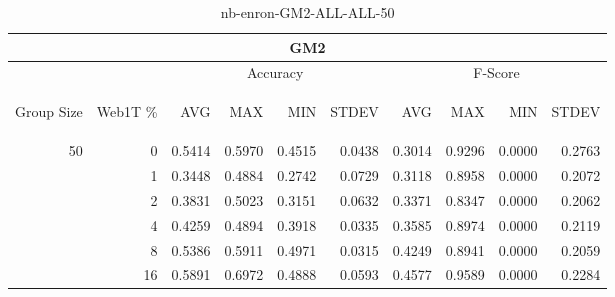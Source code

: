 \begin{center}
\begin{table}[htbp] 
 \begin{center}
\begin{tabular}{ | r | r | r | r | r | r | r | r | r | r |}
\hline
\multicolumn{10}{|c|}{GM2}\\
\hline
 & & \multicolumn{4}{|c|}{Accuracy} & \multicolumn{4}{|c|}{F-Score}\\ \cline{3-10}
\begin{sideways}Group Size\end{sideways} & \begin{sideways}Web1T \%\end{sideways} & \begin{sideways}AVG\end{sideways} & \begin{sideways}MAX\end{sideways} & \begin{sideways}MIN\end{sideways} & \begin{sideways}STDEV\end{sideways} & \begin{sideways}AVG\end{sideways} & \begin{sideways}MAX\end{sideways} & \begin{sideways}MIN\end{sideways} & \begin{sideways}STDEV\end{sideways}\\
\hline
\multirow{5}{*}{50}
 & 0 & 0.5414 & 0.5970 & 0.4515 & 0.0438 & 0.3014 & 0.9296 & 0.0000 & 0.2763\\ \cline{2-10}
 & 1 & 0.3448 & 0.4884 & 0.2742 & 0.0729 & 0.3118 & 0.8958 & 0.0000 & 0.2072\\ \cline{2-10}
 & 2 & 0.3831 & 0.5023 & 0.3151 & 0.0632 & 0.3371 & 0.8347 & 0.0000 & 0.2062\\ \cline{2-10}
 & 4 & 0.4259 & 0.4894 & 0.3918 & 0.0335 & 0.3585 & 0.8974 & 0.0000 & 0.2119\\ \cline{2-10}
 & 8 & 0.5386 & 0.5911 & 0.4971 & 0.0315 & 0.4249 & 0.8941 & 0.0000 & 0.2059\\ \cline{2-10}
 & 16 & 0.5891 & 0.6972 & 0.4888 & 0.0593 & 0.4577 & 0.9589 & 0.0000 & 0.2284\\ \cline{2-10}
\hline
\end{tabular}
\caption{nb-enron-GM2-ALL-ALL-50}
\label{table:nb-enron-GM2-ALL-ALL-50}
\end{center}
 \end{table}
\end{center}

